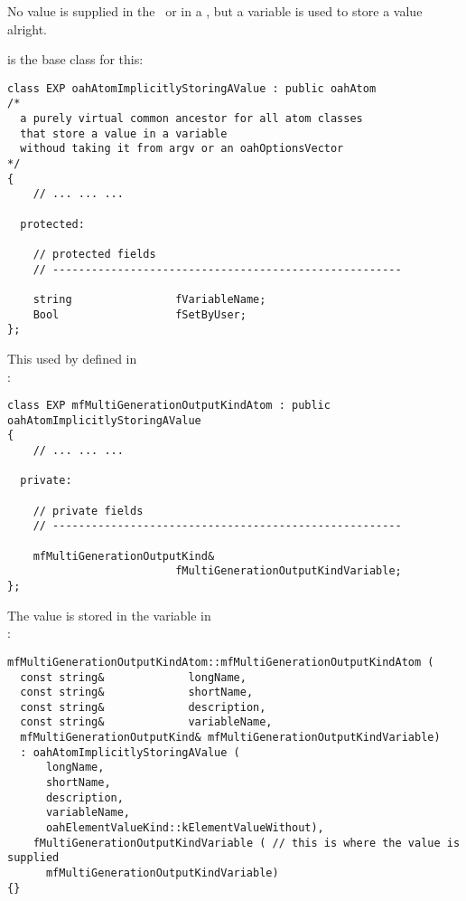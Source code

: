 No value is supplied in the \CLI\ or in a , but a variable is used to store a value alright.

 is the base class for this:
\begin{lstlisting}[language=CPlusPlus]
class EXP oahAtomImplicitlyStoringAValue : public oahAtom
/*
  a purely virtual common ancestor for all atom classes
  that store a value in a variable
  withoud taking it from argv or an oahOptionsVector
*/
{
	// ... ... ...

  protected:

    // protected fields
    // ------------------------------------------------------

    string                fVariableName;
    Bool                  fSetByUser;
};
\end{lstlisting}

This used by  defined in \\
:
\begin{lstlisting}[language=CPlusPlus]
class EXP mfMultiGenerationOutputKindAtom : public oahAtomImplicitlyStoringAValue
{
	// ... ... ...

  private:

    // private fields
    // ------------------------------------------------------

    mfMultiGenerationOutputKind&
                          fMultiGenerationOutputKindVariable;
};
\end{lstlisting}

The value is stored in the variable in \\
:
\begin{lstlisting}[language=CPlusPlus]
mfMultiGenerationOutputKindAtom::mfMultiGenerationOutputKindAtom (
  const string&             longName,
  const string&             shortName,
  const string&             description,
  const string&             variableName,
  mfMultiGenerationOutputKind& mfMultiGenerationOutputKindVariable)
  : oahAtomImplicitlyStoringAValue (
      longName,
      shortName,
      description,
      variableName,
      oahElementValueKind::kElementValueWithout),
    fMultiGenerationOutputKindVariable ( // this is where the value is supplied
      mfMultiGenerationOutputKindVariable)
{}
\end{lstlisting}


